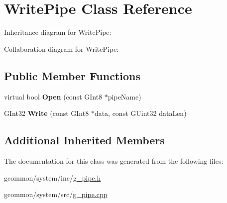 \hypertarget{class_write_pipe}{\section{Write\-Pipe Class Reference}
\label{class_write_pipe}
}


Inheritance diagram for Write\-Pipe\-:


Collaboration diagram for Write\-Pipe\-:
\subsection*{Public Member Functions}
\begin{DoxyCompactItemize}
\item 
\hypertarget{class_write_pipe_a4bc1aebd61af113b228c305043357796}{virtual bool {\bfseries Open} (const G\-Int8 $\ast$pipe\-Name)}\label{class_write_pipe_a4bc1aebd61af113b228c305043357796}

\item 
\hypertarget{class_write_pipe_ab6f05f64cc91f58c28d99191072fe5b9}{G\-Int32 {\bfseries Write} (const G\-Int8 $\ast$data, const G\-Uint32 data\-Len)}\label{class_write_pipe_ab6f05f64cc91f58c28d99191072fe5b9}

\end{DoxyCompactItemize}
\subsection*{Additional Inherited Members}


The documentation for this class was generated from the following files\-:\begin{DoxyCompactItemize}
\item 
gcommon/system/inc/\hyperlink{g__pipe_8h}{g\-\_\-pipe.\-h}\item 
gcommon/system/src/\hyperlink{g__pipe_8cpp}{g\-\_\-pipe.\-cpp}\end{DoxyCompactItemize}
